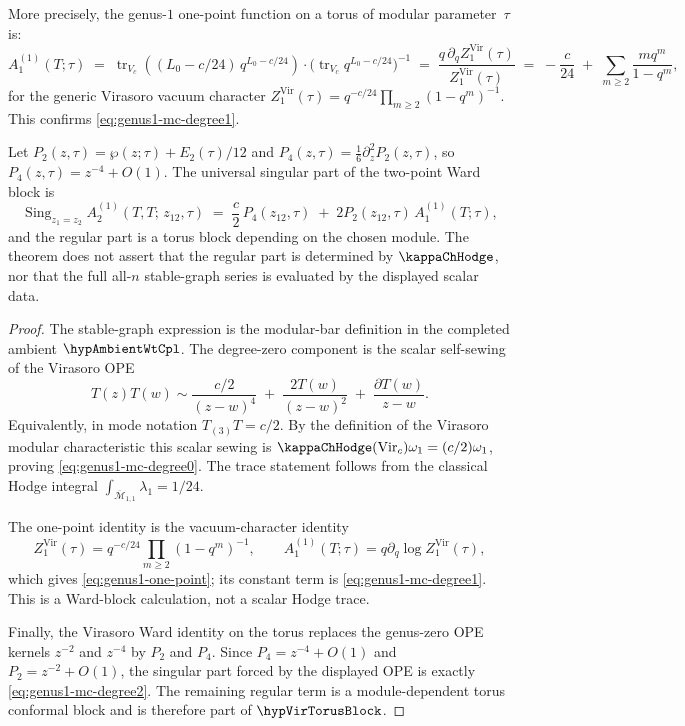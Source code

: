 \begin{theorem}
More precisely, the genus-$1$ one-point function on a torus of
modular parameter~$\tau$ is:
\begin{equation}\label{eq:genus1-one-point}
A^{(1)}_1(T;\tau)
\;=\;
\operatorname{tr}_{V_c}\!\left((L_0-c/24)\,q^{L_0 - c/24}\right)\cdot
\bigl(\operatorname{tr}_{V_c} q^{L_0 - c/24}\bigr)^{-1}
\;=\;
\frac{q\,\partial_q Z^{\mathrm{Vir}}_1(\tau)}{Z^{\mathrm{Vir}}_1(\tau)}
\;=\;
-\frac{c}{24}
\;+\;\sum_{m\ge2}\frac{m q^m}{1-q^m},
\end{equation}
for the generic Virasoro vacuum character
\(Z^{\mathrm{Vir}}_1(\tau)
=q^{-c/24}\prod_{m\ge2}(1-q^m)^{-1}\).  This confirms
\eqref{eq:genus1-mc-degree1}.

Let \(P_2(z,\tau)=\wp(z;\tau)+E_2(\tau)/12\) and
\(P_4(z,\tau)=\frac16\partial_z^2P_2(z,\tau)\), so
\(P_4(z,\tau)=z^{-4}+O(1)\).  The universal singular part of the
two-point Ward block is
\begin{equation}\label{eq:genus1-mc-degree2}
\operatorname{Sing}_{z_1=z_2} A^{(1)}_2(T,T;\,z_{12},\tau)
\;=\;
\frac{c}{2}\,P_4(z_{12},\tau)
\;+\;
2P_2(z_{12},\tau)\,A^{(1)}_1(T;\tau),
\end{equation}
and the regular part is a torus block depending on the chosen module.
The theorem does not assert that the regular part is determined by
\(\kappaChHodge\), nor that the full all-\(n\) stable-graph series is
evaluated by the displayed scalar data.
\end{theorem}

\begin{proof}
The stable-graph expression is the modular-bar definition in the
completed ambient \(\hypAmbientWtCpl\).  The degree-zero component is
the scalar self-sewing of the Virasoro OPE
\[
T(z)T(w)\sim
\frac{c/2}{(z-w)^4}
\;+\;
\frac{2T(w)}{(z-w)^2}
\;+\;
\frac{\partial T(w)}{z-w}.
\]
Equivalently, in mode notation \(T_{(3)}T=c/2\).  By the definition of
the Virasoro modular characteristic this scalar sewing is
\(\kappaChHodge(\mathrm{Vir}_c)\omega_1=(c/2)\omega_1\), proving
\eqref{eq:genus1-mc-degree0}.  The trace statement follows from the
classical Hodge integral
\(\int_{\overline{\mathcal M}_{1,1}}\lambda_1=1/24\).

The one-point identity is the vacuum-character identity
\[
Z^{\mathrm{Vir}}_1(\tau)
=q^{-c/24}\prod_{m\ge2}(1-q^m)^{-1},
\qquad
A^{(1)}_1(T;\tau)=q\partial_q\log Z^{\mathrm{Vir}}_1(\tau),
\]
which gives \eqref{eq:genus1-one-point}; its constant term is
\eqref{eq:genus1-mc-degree1}.  This is a Ward-block calculation, not
a scalar Hodge trace.

Finally, the Virasoro Ward identity on the torus replaces the genus-zero
OPE kernels \(z^{-2}\) and \(z^{-4}\) by \(P_2\) and \(P_4\).  Since
\(P_4=z^{-4}+O(1)\) and \(P_2=z^{-2}+O(1)\), the singular part forced
by the displayed OPE is exactly \eqref{eq:genus1-mc-degree2}.  The
remaining regular term is a module-dependent torus conformal block and
is therefore part of \(\hypVirTorusBlock\).
\end{proof}

